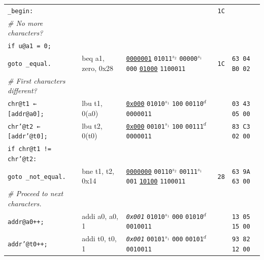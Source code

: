 \documentclass[a4paper,12pt,final]{article}
\begin{document}
\begin{table}[!htbp]
\begin{adjustwidth}{-1cm}{-1cm}
\begin{center}
\begin{tabular}{l|ll|l|l}
\texttt{\_begin:} &  &  & \texttt{1C} & \\[0pt]
\hspace{1.053000em} \emph{\# No more characters?} &  &  &  & \\[0pt]
\hspace{1.053000em} \texttt{if u@a1 = 0;} &  &  &  & \\[0pt]
\hspace{2.106000em}   \texttt{goto \_equal.} & beq a1, zero, 0x28 & \uline{\texttt{0000001}} \texttt{01011}​\(^{s_{2}}\) \texttt{00000}​\(^{s_{1}}\) \texttt{000} \uline{\texttt{01000}} \texttt{1100011} & \texttt{1C} & \texttt{63 04 B0 02}\\[0pt]
\hspace{1.053000em} \emph{\# First characters different?} &  &  &  & \\[0pt]
\hspace{1.053000em} \texttt{chr@t1 ← [addr@a0];} & lbu t1, 0(a0) & \uline{\texttt{0x000}}                    \texttt{01010}​\(^{s_{1}}\) \texttt{100} \texttt{00110}​\(^{d}\)  \texttt{0000011} &  & \texttt{03 43 05 00}\\[0pt]
\hspace{1.053000em} \texttt{chr'@t2 ← [addr'@t0];} & lbu t2, 0(t0) & \uline{\texttt{0x000}}                    \texttt{00101}​\(^{s_{1}}\) \texttt{100} \texttt{00111}​\(^{d}\)  \texttt{0000011} &  & \texttt{83 C3 02 00}\\[0pt]
\hspace{1.053000em} \texttt{if chr@t1 != chr'@t2:} &  &  &  & \\[0pt]
\hspace{2.106000em}   \texttt{goto \_not\_equal.} & bne t1, t2, 0x14 & \uline{\texttt{0000000}} \texttt{00110}​\(^{s_{2}}\) \texttt{00111}​\(^{s_{1}}\) \texttt{001} \uline{\texttt{10100}} \texttt{1100011} & \texttt{28} & \texttt{63 9A 63 00}\\[0pt]
\hspace{1.053000em} \emph{\# Proceed to next characters.} &  &  &  & \\[0pt]
\hspace{1.053000em} \texttt{addr@a0++;} & addi a0, a0, 1 & \emph{\texttt{0x001}}                    \texttt{01010}​\(^{s_{1}}\) \texttt{000} \texttt{01010}​\(^{d}\)  \texttt{0010011} &  & \texttt{13 05 15 00}\\[0pt]
\hspace{1.053000em} \texttt{addr'@t0++;} & addi t0, t0, 1 & \emph{\texttt{0x001}}                    \texttt{00101}​\(^{s_{1}}\) \texttt{000} \texttt{00101}​\(^{d}\)  \texttt{0010011} &  & \texttt{93 82 12 00}\\[0pt]

\end{tabular}
\end{center}
\end{adjustwidth}
\end{table}
\end{document}
